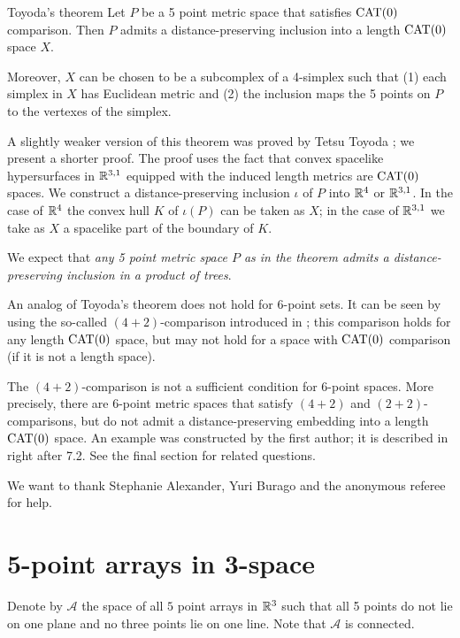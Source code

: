 \documentclass{article}
\begin{document}
\begin{thm}{Toyoda's theorem}
Let $P$ be a 5 point metric space that satisfies $\mathrm{CAT}(0)$ comparison.
Then $P$ admits a distance-preserving inclusion into a length $\mathrm{CAT}(0)$ space $X$.

Moreover,
$X$ can be chosen to be a subcomplex of a 4-simplex such that (1) each simplex in $X$ has Euclidean metric and (2) the inclusion maps the 5 points on $P$ to the vertexes of the simplex.
\end{thm}

A slightly weaker version of this theorem was proved by Tetsu Toyoda \cite{toyoda};
we present a shorter proof.
The proof uses the fact that convex spacelike hypersurfaces in $\mathbb{R}^{3,1}$ equipped with the induced length metrics are $\mathrm{CAT}(0)$ spaces.
We construct a distance-preserving inclusion $\iota$ of $P$ into $\mathbb{R}^4$ or $\mathbb{R}^{3,1}$.
In the case of $\mathbb{R}^4$ the convex hull $K$ of $\iota(P)$ can be taken as $X$;
in the case of $\mathbb{R}^{3,1}$ we take as $X$ a spacelike part of the boundary of $K$.

We expect that \emph{any 5 point metric space $P$ as in the theorem admits a distance-preserving inclusion in a product of trees}.

An analog of Toyoda's theorem does not hold for 6-point sets.
It can be seen by using the so-called $(4{+}2)$-comparison introduced in \cite{alexander-kapovitch-petrunin-2011};
this comparison holds for any length $\mathrm{CAT}(0)$ space, but may not hold for a space with $\mathrm{CAT}(0)$ comparison (if it is not a length space).

{\sloppy

The $(4{+}2)$-comparison is not a sufficient condition for $6$-point spaces.
More precisely, there are 6-point metric spaces that satisfy $(4{+}2)$ and $(2{+}2)$-comparisons, but do not admit a distance-preserving embedding into a length $\mathrm{CAT}(0)$ space.
An example was constructed by the first author; it is described in \cite{alexander-kapovitch-petrunin-2011} right after 7.2.
See the final section for related questions.

}

We want to thank Stephanie Alexander, Yuri Burago and the anonymous referee for help.

\section{5-point arrays in 3-space}

Denote by $\mathcal{A}$ the space of all $5$ point arrays in $\mathbb{R}^3$ such that all 5 points do not lie on one plane and no three points lie on one line.
Note that $\mathcal{A}$ is connected.
\end{document}
